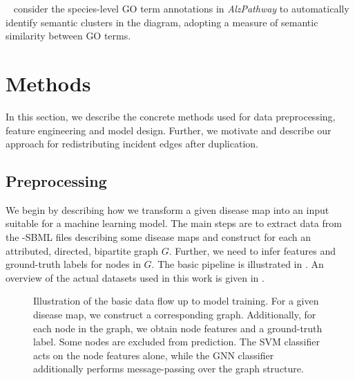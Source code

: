 \documentclass[
	fontsize=10pt, %
	twoside=true, %
	secnumdepth=1, %
  toc=indentunnumbered %
]{kaobook}
\begin{document}
\citeauthor{ostaszewski_ClusteringApproachesVisual_2018}~
\cite{ostaszewski_ClusteringApproachesVisual_2018}
consider the
species-level GO term annotations in \textit{AlzPathway} to automatically
identify semantic clusters in the diagram, adopting a measure of semantic
similarity between GO terms.











\chapter{Methods}
\label{sec:methods}

In this section, we describe the concrete methods used for data
preprocessing, feature engineering and model design. Further, we motivate and
describe our approach for redistributing incident edges after duplication.

\section{Preprocessing}
\label{sec:datasets}

We begin by describing how we transform a given disease map into an input
suitable for a machine learning model.
%
The main steps are to extract data from the -SBML files
describing some disease maps and construct for each an attributed, directed,
bipartite graph $G$. Further, we need to infer features and ground-truth labels for nodes in
$G$. The basic pipeline is illustrated in . An overview of
the actual datasets used in this work is given in .


\begin{figure}[h]
  \centering
  \caption{Illustration of the basic data flow up to model training. For a given
    disease map, we construct a corresponding graph. Additionally, for each node
    in the graph, we obtain node features and a ground-truth label. Some nodes are
    excluded from prediction. The SVM classifier acts on the node features alone,
    while the GNN classifier additionally performs message-passing over the graph structure.}
  \label{fig:diag-pipeline}
\end{figure}
\end{document}
